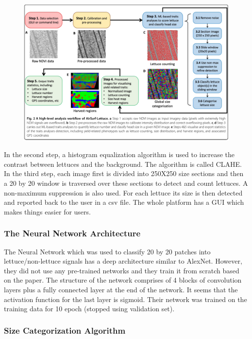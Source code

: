 \documentclass{article}
\begin{document}
\begin{figure}[H]
	\begin{center}
		\includegraphics[width=14cm]{img/1}
	\end{center}
\end{figure}
	
In the second step, a histogram equalization algorithm is used to increase the contrast between lettuces and the background. The algorithm is called CLAHE. In the third step, each image first is divided into 250X250 size sections and then a 20 by 20 window is traversed over these sections to detect and count lettuces. A non-maximum suppression is also used. For each lettuce its size is then detected and reported back to the user in a csv file. The whole platform has a GUI which makes things easier for users. 

\subsubsection{The Neural Network Architecture}

The Neural Network which was used to classify 20 by 20 patches into lettuce/non-lettuce signals has a deep architecture similar to AlexNet. However, they did not use any pre-trained networks and they train it from scratch based on the paper. The structure of the network comprises of 4 blocks of convolution layers plus a fully connected layer at the end of the network. It seems that the activation function for the last layer is sigmoid. Their network was trained on the training data for 10 epoch (stopped using validation set). 

\subsubsection{Size Categorization Algorithm}
\end{document}

